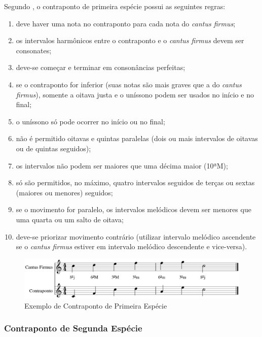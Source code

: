         Segundo , o contraponto de primeira espécie possui as seguintes regras:

        \begin{enumerate}
          \item deve haver uma nota no contraponto para cada nota do \textit{cantus firmus};
          \item os intervalos harmônicos entre o contraponto e o \textit{cantus firmus} devem ser consonates;
          \item deve-se começar e terminar em consonâncias perfeitas;
          \item se o contraponto for inferior (suas notas são mais graves que a do \textit{cantus firmus}), somente a oitava justa e o uníssono podem ser usados no início e no final;
          \item o uníssono só pode ocorrer no início ou no final;
          \item não é permitido oitavas e quintas paralelas (dois ou mais intervalos de oitavas ou de quintas seguidos);
          \item os intervalos não podem ser maiores que uma décima maior (10ªM);
          \item só são permitidos, no máximo, quatro intervalos seguidos de terças ou sextas (maiores ou menores) seguidos;
          \item se o movimento for paralelo, os intervalos melódicos devem ser menores que uma quarta ou um salto de oitava;
          \item deve-se priorizar movimento contrário (utilizar intervalo melódico ascendente se o \textit{cantus firmus} estiver em intervalo melódico descendente e vice-versa).
        \end{enumerate}

        \begin{figure}[htb]
          \centering
          \includegraphics[scale=0.55]{figuras/contrapontoprimeira.eps}
          \caption{Exemplo de Contraponto de Primeira Espécie}
          \label{contrapontoprimeira}
        \end{figure}

      \subsubsection[Contraponto de Segunda Espécie]{Contraponto de Segunda Espécie}

